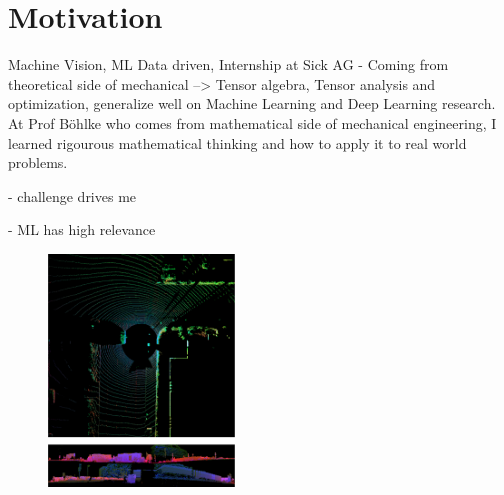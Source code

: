 


\setlength{\columnsep}{15pt}%
\setlength{\intextsep}{0pt plus 0pt minus 0pt}

\begin{minipage}[t]{504pt}
\begin{minipage}[t]{350pt}
\setlength{\parindent}{\myindent}
\setlength{\parskip}{\myparskip}

 \vspace*{-10pt}

\section{Motivation}
Machine Vision, ML Data driven, Internship at Sick AG
- Coming from theoretical side of mechanical --> Tensor algebra, Tensor analysis and optimization, generalize well on 
Machine Learning and Deep Learning research. At Prof Böhlke who comes from mathematical side of mechanical engineering, I learned rigourous 
mathematical thinking and how to apply it to real world problems.


- challenge drives me

- ML has high relevance
\color{red}{ELLIS, Why Ellis:
- ELLIS is a great opportunity to work with the best in the field, to learn from them and to contribute to the field.
- ELLIS is international, oppurtunities
}\color{black}
\end{minipage}
\hspace{13pt}\begin{minipage}[t]{140pt}
\begin{figure}[H]
\includegraphics[width=140pt]{pic/fusion.png}
\end{figure}
\end{minipage}
\end{minipage}



